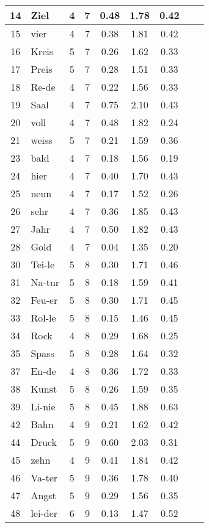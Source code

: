 {\begin{longtable}{clccccccc}
14 & Ziel & 4 & 7 & 0.48 & 1.78 & 0.42 \\ \hline
15 & vier & 4 & 7 & 0.38 & 1.81 & 0.42 \\ \hline
16 & Kreis & 5 & 7 & 0.26 & 1.62 & 0.33 \\ \hline
17 & Preis & 5 & 7 & 0.28 & 1.51 & 0.33 \\ \hline
18 & Re-de & 4 & 7 & 0.22 & 1.56 & 0.33 \\ \hline
19 & Saal & 4 & 7 & 0.75 & 2.10 & 0.43 \\ \hline
20 & voll & 4 & 7 & 0.48 & 1.82 & 0.24 \\ \hline
21 & weiss & 5 & 7 & 0.21 & 1.59 & 0.36 \\ \hline
23 & bald & 4 & 7 & 0.18 & 1.56 & 0.19 \\ \hline
24 & hier & 4 & 7 & 0.40 & 1.70 & 0.43 \\ \hline
25 & neun & 4 & 7 & 0.17 & 1.52 & 0.26 \\ \hline
26 & sehr & 4 & 7 & 0.36 & 1.85 & 0.43 \\ \hline
27 & Jahr & 4 & 7 & 0.50 & 1.82 & 0.43 \\ \hline
28 & Gold & 4 & 7 & 0.04 & 1.35 & 0.20 \\ \hline
30 & Tei-le & 5 & 8 & 0.30 & 1.71 & 0.46 \\ \hline
31 & Na-tur & 5 & 8 & 0.18 & 1.59 & 0.41 \\ \hline
32 & Feu-er & 5 & 8 & 0.30 & 1.71 & 0.45 \\ \hline
33 & Rol-le & 5 & 8 & 0.15 & 1.46 & 0.45 \\ \hline
34 & Rock & 4 & 8 & 0.29 & 1.68 & 0.25 \\ \hline
35 & Spass & 5 & 8 & 0.28 & 1.64 & 0.32 \\ \hline
37 & En-de & 4 & 8 & 0.36 & 1.72 & 0.33 \\ \hline
38 & Kunst & 5 & 8 & 0.26 & 1.59 & 0.35 \\ \hline
39 & Li-nie & 5 & 8 & 0.45 & 1.88 & 0.63 \\ \hline
42 & Bahn & 4 & 9 & 0.21 & 1.62 & 0.42 \\ \hline
44 & Druck & 5 & 9 & 0.60 & 2.03 & 0.31 \\ \hline
45 & zehn & 4 & 9 & 0.41 & 1.84 & 0.42 \\ \hline
46 & Va-ter & 5 & 9 & 0.36 & 1.78 & 0.40 \\ \hline
47 & Angst & 5 & 9 & 0.29 & 1.56 & 0.35 \\ \hline
48 & lei-der & 6 & 9 & 0.13 & 1.47 & 0.52 \\ \hline

\end{longtable}}
